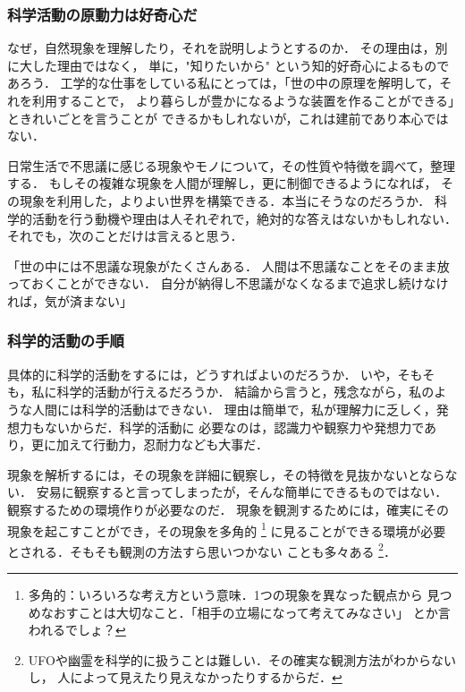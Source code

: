        \subsubsection{科学活動の原動力は好奇心だ}
            なぜ，自然現象を理解したり，それを説明しようとするのか．
            その理由は，別に大した理由ではなく，
            単に，"知りたいから" という知的好奇心によるものであろう．
            工学的な仕事をしている私にとっては，「世の中の原理を解明して，それを利用することで，
            より暮らしが豊かになるような装置を作ることができる」ときれいごとを言うことが
            できるかもしれないが，これは建前であり本心ではない．

            日常生活で不思議に感じる現象やモノについて，その性質や特徴を調べて，整理する．
            もしその複雑な現象を人間が理解し，更に制御できるようになれば，
            その現象を利用した，よりよい世界を構築できる．本当にそうなのだろうか．
            科学的活動を行う動機や理由は人それぞれで，絶対的な答えはないかもしれない．
            それでも，次のことだけは言えると思う．

            「世の中には不思議な現象がたくさんある．
            人間は不思議なことをそのまま放っておくことができない．
            自分が納得し不思議がなくなるまで追求し続けなければ，気が済まない」

        \subsubsection{科学的活動の手順}
            具体的に科学的活動をするには，どうすればよいのだろうか．
            いや，そもそも，私に科学的活動が行えるだろうか．
            結論から言うと，残念ながら，私のような人間には科学的活動はできない．
            理由は簡単で，私が理解力に乏しく，発想力もないからだ．科学的活動に
            必要なのは，認識力や観察力や発想力であり，更に加えて行動力，忍耐力なども大事だ．

            現象を解析するには，その現象を詳細に観察し，その特徴を見抜かないとならない．
            安易に観察すると言ってしまったが，そんな簡単にできるものではない．
            観察するための環境作りが必要なのだ．
            現象を観測するためには，確実にその現象を起こすことができ，その現象を多角的
                \footnote{
                    多角的：いろいろな考え方という意味．1つの現象を異なった観点から
                    見つめなおすことは大切なこと．「相手の立場になって考えてみなさい」
                    とか言われるでしょ？
                }
            に見ることができる環境が必要とされる．そもそも観測の方法すら思いつかない
            ことも多々ある
                \footnote{
                    UFOや幽霊を科学的に扱うことは難しい．その確実な観測方法がわからないし，
                    人によって見えたり見えなかったりするからだ．
                }．

